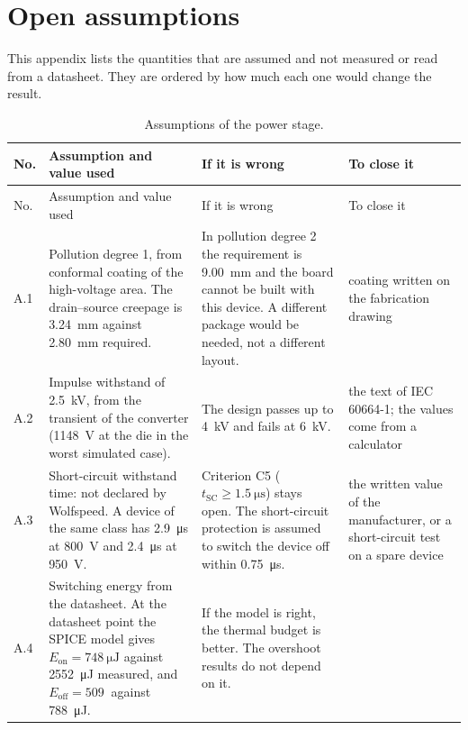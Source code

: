 \chapter{Open assumptions}
\label{app:assumptions}

This appendix lists the quantities that are assumed and not measured or read
from a datasheet. They are ordered by how much each one would change the
result.

{\small
\setlength{\tabcolsep}{4pt}
\zebra
\begin{longtable}{L{0.05\textwidth}L{0.36\textwidth}L{0.30\textwidth}L{0.20\textwidth}}
\caption{Assumptions of the power stage.}
\label{tab:assumptions}\\
\toprule
No. & Assumption and value used & If it is wrong & To close it \\
\midrule
\endfirsthead
\toprule
No. & Assumption and value used & If it is wrong & To close it \\
\midrule
\endhead
A.1 & Pollution degree 1, from conformal coating of the high-voltage area. The drain--source creepage is \SI{3.24}{\milli\metre} against \SI{2.80}{\milli\metre} required.
    & In pollution degree 2 the requirement is \SI{9.00}{\milli\metre} and the board cannot be built with this device. A different package would be needed, not a different layout.
    & coating written on the fabrication drawing \\
A.2 & Impulse withstand of \SI{2.5}{\kilo\volt}, from the transient of the converter (\SI{1148}{\volt} at the die in the worst simulated case).
    & The design passes up to \SI{4}{\kilo\volt} and fails at \SI{6}{\kilo\volt}.
    & the text of IEC 60664-1; the values come from a calculator \\
A.3 & Short-circuit withstand time: not declared by Wolfspeed. A device of the same class has \SI{2.9}{\micro\second} at \SI{800}{\volt} and \SI{2.4}{\micro\second} at \SI{950}{\volt}.
    & Criterion C5 ($t_\mathrm{SC} \geq \SI{1.5}{\micro\second}$) stays open. The short-circuit protection is assumed to switch the device off within \SI{0.75}{\micro\second}.
    & the written value of the manufacturer, or a short-circuit test on a spare device \\
A.4 & Switching energy from the datasheet. At the datasheet point the SPICE model gives $E_\mathrm{on} = \SI{748}{\micro\joule}$ against \SI{2552}{\micro\joule} measured, and $E_\mathrm{off} = \SI{509}{}$ against \SI{788}{\micro\joule}.
    & If the model is right, the thermal budget is better. The overshoot results do not depend on it.

\end{longtable}}
